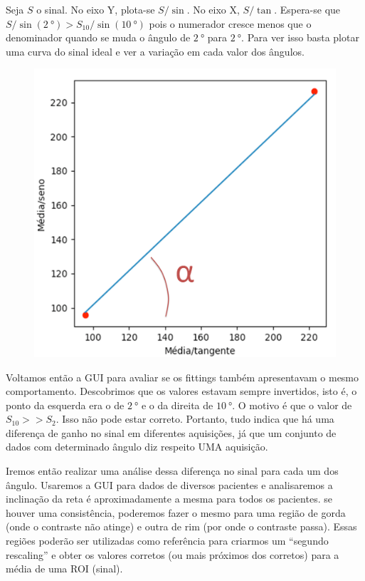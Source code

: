 \documentclass[idxtotoc,hyperref,openany]{labbook} %
\begin{document}
Seja $S$ o sinal. No eixo Y, plota-se $S/\sin$. No eixo X, $S/\tan$. Espera-se que $S / \sin(\SI{2}{\degree}) > S_{10} / \sin(\SI{10}{\degree})$ pois o numerador cresce menos que o denominador quando se muda o ângulo de $\SI{2}{\degree}$ para $\SI{2}{\degree}$. Para ver isso basta plotar uma curva do sinal ideal e ver a variação em cada valor dos ângulos.


\begin{figure}[H]
	\begin{center}
		\includegraphics[width=0.5\linewidth]{linearcurve}
	\end{center}
	\caption{}
	\label{fig:linearcurve}
\end{figure}


Voltamos então a GUI para avaliar se os fittings também apresentavam o mesmo comportamento. Descobrimos que os valores estavam sempre invertidos, isto é, o ponto da esquerda era o de $\SI{2}{\degree}$ e o da direita de $\SI{10}{\degree}$. O motivo é que o valor de $S_{10} >> S_2$. Isso não pode estar correto. Portanto, tudo indica que há uma diferença de ganho no sinal em diferentes aquisições, já que um conjunto de dados com determinado ângulo diz respeito UMA aquisição.

Iremos então realizar uma análise dessa diferença no sinal para cada um dos ângulo. Usaremos a GUI para dados de diversos pacientes e analisaremos a inclinação da reta é aproximadamente a mesma para todos os pacientes. se houver uma consistência, poderemos fazer o mesmo para uma região de gorda (onde o contraste não atinge) e outra de rim (por onde o contraste passa). Essas regiões poderão ser utilizadas como referência para criarmos um ``segundo rescaling'' e obter os valores corretos (ou mais próximos dos corretos) para a média de uma ROI (sinal).

\end{document}
